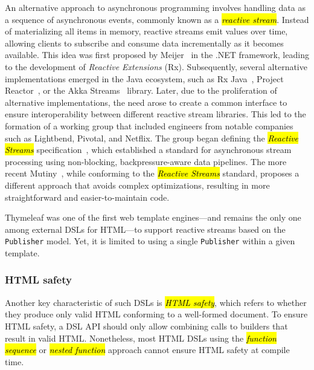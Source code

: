 \documentclass[software,article,accept,pdftex,moreauthors]{Definitions/mdpi}
\begin{document}
An alternative approach to asynchronous programming involves handling data as
a sequence of asynchronous events, commonly known as a \textit{\hl{reactive stream}}.
Instead of materializing all items in memory, reactive streams emit values over
time, allowing clients to subscribe and consume data incrementally as it becomes
available.
This idea was first proposed by Meijer~\cite{rx-observable} in the .NET
framework, leading to the development of \textit{Reactive Extensions} (Rx).
Subsequently, several alternative implementations emerged in the Java ecosystem,
such as Rx Java~\cite{rxjava}, Project Reactor~\cite{projectreactor}, or the
Akka Streams~\cite{akka} library.
Later, due to the proliferation of alternative implementations, the need arose to
create a common interface to ensure interoperability between different reactive
stream libraries. This led to the formation of a working group that included
engineers from notable companies such as Lightbend, Pivotal, and Netflix.
The group began defining the \textit{\hl{Reactive Streams}}
specification~\cite{ReactiveStreams}, which established a standard for
asynchronous stream processing using non-blocking, backpressure-aware data
pipelines.
The more recent Mutiny~\cite{mutiny2021}, while conforming to the
\textit{\hl{Reactive Streams}} standard, proposes a different approach that avoids
complex optimizations, resulting in more straightforward and easier-to-maintain
code.

Thymeleaf was one of the first web template engines---and remains the only one
among external DSLs for HTML---to support reactive streams based on the
\texttt{Publisher} model. Yet, it is limited to using a single
\texttt{Publisher} within a given template.


\subsubsection{HTML safety}\label{s2.1.4}

Another key characteristic of such DSLs is \textit{\hl{HTML safety}}, which refers
to whether they produce only valid HTML conforming to a well-formed document.
To ensure HTML safety, a DSL API should only allow combining calls to builders
that result in valid HTML. Nonetheless, most HTML DSLs using the \textit{\hl{function
  sequence}} or \textit{\hl{nested function}} approach cannot ensure HTML safety at
compile time.
\end{document}
